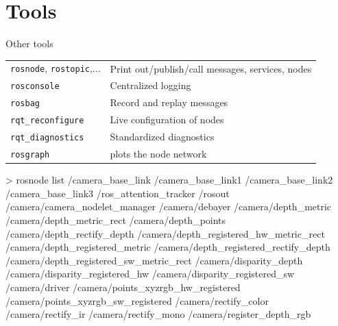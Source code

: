 \documentclass[compress]{beamer}
\begin{document}
\section{Tools}



\begin{frame}{Other tools}
    \begin{table}[]
        \begin{tabularx}{\linewidth}{l>{\raggedright}X}
            \toprule
            \texttt{rosnode}, \texttt{rostopic},... & Print out/publish/call messages, services, nodes \tabularnewline
            \texttt{rosconsole} & Centralized logging \tabularnewline
            \texttt{rosbag} & Record and replay messages \tabularnewline
            \texttt{rqt\_reconfigure} & Live configuration of nodes \tabularnewline
            \texttt{rqt\_diagnostics} & Standardized diagnostics \tabularnewline
            \texttt{rosgraph} & plots the node network \tabularnewline
            \bottomrule
        \end{tabularx}
    \end{table}
\end{frame}

\begin{frame}[fragile]{}
\begin{shcode}
> rosnode list 
/camera_base_link
/camera_base_link1
/camera_base_link2
/camera_base_link3
/ros_attention_tracker
/rosout
/camera/camera_nodelet_manager
/camera/debayer
/camera/depth_metric
/camera/depth_metric_rect
/camera/depth_points
/camera/depth_rectify_depth
/camera/depth_registered_hw_metric_rect
/camera/depth_registered_metric
/camera/depth_registered_rectify_depth
/camera/depth_registered_sw_metric_rect
/camera/disparity_depth
/camera/disparity_registered_hw
/camera/disparity_registered_sw
/camera/driver
/camera/points_xyzrgb_hw_registered
/camera/points_xyzrgb_sw_registered
/camera/rectify_color
/camera/rectify_ir
/camera/rectify_mono
/camera/register_depth_rgb
\end{shcode}

\end{frame}
\end{document}
